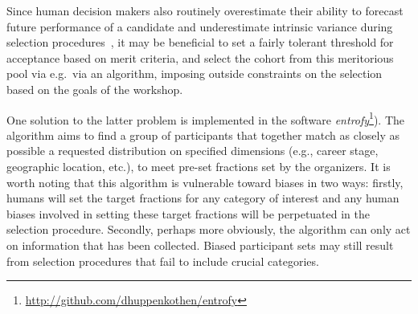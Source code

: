 \documentclass{aastex62}
\begin{document}
Since human decision makers also routinely overestimate their ability to forecast future performance of a candidate and underestimate intrinsic variance during selection procedures~\citep{highhouse2008}, it may be beneficial to set a fairly tolerant threshold for acceptance based on merit criteria, and select the cohort from this meritorious pool via e.g.\ via an algorithm, imposing outside constraints on the selection based on the goals of the workshop.

One solution to the latter problem is implemented in the software \textit{entrofy}\footnote{\url{http://github.com/dhuppenkothen/entrofy}}).
The algorithm aims to find a group of participants that together match as closely as possible a requested distribution on specified dimensions (e.g., career stage, geographic location, etc.), to meet pre-set fractions set by the organizers.
It is worth noting that this algorithm is vulnerable toward biases in two ways: firstly, humans will set the target fractions for any category of interest and any human biases involved in setting these target fractions will be perpetuated in the selection procedure.
Secondly, perhaps more obviously, the algorithm can only act on information that has been collected.
Biased participant sets may still result from selection procedures that fail to include crucial categories.
\end{document}
